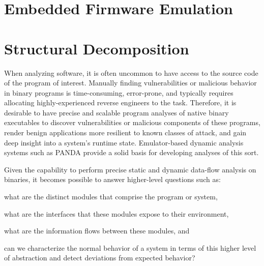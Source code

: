 \documentclass[letterpaper,twoside,11pt,headings=small]{scrartcl}
\newcommand{\dynamicsys}{\textsc{PANDA}\xspace}
\begin{document}
\section{Embedded Firmware Emulation}
\label{sec:research:firmware}



\section{Structural Decomposition}
\label{sec:research:structure}

When analyzing software, it is often uncommon to have access to the source
code of the program of interest.  Manually finding vulnerabilities or
malicious behavior in binary programs is time-consuming, error-prone, and
typically requires allocating highly-experienced reverse engineers to the
task. Therefore, it is desirable to have precise and scalable program analyses
of native binary executables to discover vulnerabilities or malicious
components of these programs, render benign applications more resilient to
known classes of attack, and gain deep insight into a system's runtime state.
Emulator-based dynamic analysis systems such as \dynamicsys provide a solid
basis for developing analyses of this sort.

Given the capability to perform precise static and dynamic data-flow analysis
on binaries, it becomes possible to answer higher-level questions such as:%
\begin{inparaenum}
    \item what are the distinct modules that comprise the program or system,
    \item what are the interfaces that these modules expose to their environment,
    \item what are the information flows between these modules, and
    \item can we characterize the normal behavior of a system in terms of this higher
        level of abstraction and detect deviations from expected behavior?
\end{inparaenum}
\end{document}
